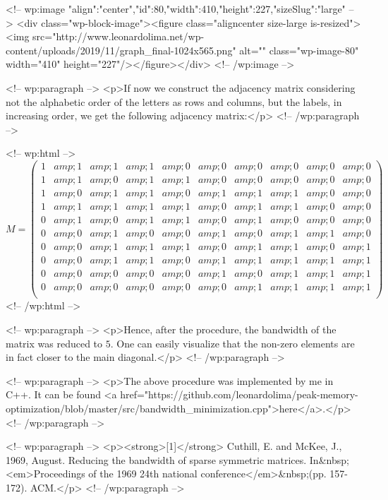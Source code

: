 <!-- wp:image {"align":"center","id":80,"width":410,"height":227,"sizeSlug":"large"} -->
<div class="wp-block-image"><figure class="aligncenter size-large is-resized"><img src="http://www.leonardolima.net/wp-content/uploads/2019/11/graph_final-1024x565.png" alt="" class="wp-image-80" width="410" height="227"/></figure></div>
<!-- /wp:image -->

<!-- wp:paragraph -->
<p>If now we construct the adjacency matrix considering not the alphabetic order of the letters as rows and columns, but the labels, in increasing order, we get the following adjacency matrix:</p>
<!-- /wp:paragraph -->

<!-- wp:html -->
$$
M = 
\begin{pmatrix}
 1 &amp; 1 &amp; 1 &amp; 1 &amp; 0 &amp; 0 &amp; 0 &amp; 0 &amp; 0 &amp; 0\\ 
 1 &amp; 1 &amp; 0 &amp; 1 &amp; 1 &amp; 0 &amp; 0 &amp; 0 &amp; 0 &amp; 0\\ 
 1 &amp; 0 &amp; 1 &amp; 1 &amp; 0 &amp; 1 &amp; 1 &amp; 1 &amp; 0 &amp; 0\\
 1 &amp; 1 &amp; 1 &amp; 1 &amp; 1 &amp; 0 &amp; 1 &amp; 1 &amp; 0 &amp; 0\\ 
 0 &amp; 1 &amp; 0 &amp; 1 &amp; 1 &amp; 0 &amp; 1 &amp; 0 &amp; 0 &amp; 0\\ 
 0 &amp; 0 &amp; 1 &amp; 0 &amp; 0 &amp; 1 &amp; 0 &amp; 1 &amp; 1 &amp; 0\\ 
 0 &amp; 0 &amp; 1 &amp; 1 &amp; 1 &amp; 0 &amp; 1 &amp; 1 &amp; 0 &amp; 1\\ 
 0 &amp; 0 &amp; 1 &amp; 1 &amp; 0 &amp; 1 &amp; 1 &amp; 1 &amp; 1 &amp; 1\\ 
 0 &amp; 0 &amp; 0 &amp; 0 &amp; 0 &amp; 1 &amp; 0 &amp; 1 &amp; 1 &amp; 1\\ 
 0 &amp; 0 &amp; 0 &amp; 0 &amp; 0 &amp; 0 &amp; 1 &amp; 1 &amp; 1 &amp; 1\\ 
 \end{pmatrix}
$$
<!-- /wp:html -->

<!-- wp:paragraph -->
<p>Hence, after the procedure, the bandwidth of the matrix was reduced to $5$. One can easily visualize that the non-zero elements are in fact closer to the main diagonal.</p>
<!-- /wp:paragraph -->

<!-- wp:paragraph -->
<p>The above procedure was implemented by me in C++. It can be found <a href="https://github.com/leonardolima/peak-memory-optimization/blob/master/src/bandwidth_minimization.cpp">here</a>.</p>
<!-- /wp:paragraph -->

<!-- wp:paragraph -->
<p><strong>[1]</strong> Cuthill, E. and McKee, J., 1969, August. Reducing the bandwidth of sparse symmetric matrices. In&nbsp;<em>Proceedings of the 1969 24th national conference</em>&nbsp;(pp. 157-172). ACM.</p>
<!-- /wp:paragraph -->

